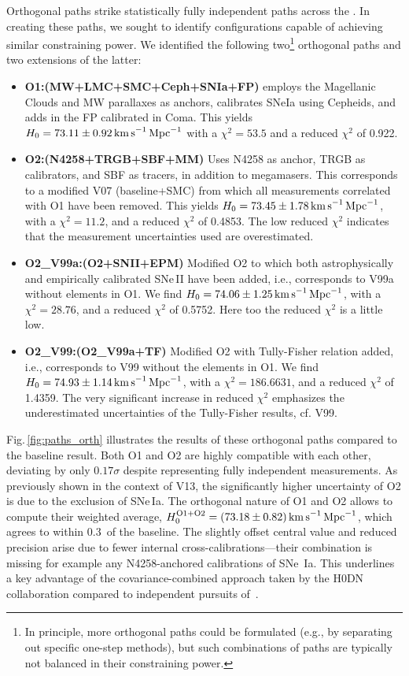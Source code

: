 Orthogonal paths strike statistically fully independent paths across the \DN{}. In creating these paths, we sought to identify configurations capable of achieving similar constraining power.
We identified the following two\footnote{In principle, more orthogonal paths could be formulated (e.g., by separating out specific one-step methods), but such combinations of paths are typically not balanced in their constraining power.} orthogonal paths and two extensions of the latter:
\begin{itemize}
    \item \textbf{O1:(MW+LMC+SMC+Ceph+SNIa+FP)} employs the Magellanic Clouds and MW parallaxes as anchors, calibrates SNeIa using Cepheids, and adds in the FP calibrated in Coma. This yields $H_0 = 73.11 \pm 0.92 \,{\rm km\,s}^{-1}{\rm\,Mpc}^{-1}$ with a $\chi^2=53.5$ and a reduced $\chi^2$ of 0.922.
    \item \textbf{O2:(N4258+TRGB+SBF+MM)} Uses N4258 as anchor, TRGB as calibrators, and SBF as tracers, in addition to megamasers. This corresponds to a modified V07 (baseline+SMC) from which all measurements correlated with O1 have been removed. This yields $H_0 = 73.45 \pm 1.78 \,{\rm km\,s}^{-1}{\rm\,Mpc}^{-1}$, with a $\chi^2=11.2$, and a reduced  $\chi^2$ of 0.4853. The low reduced $\chi^2$ indicates that the measurement uncertainties used are overestimated.
    \item \textbf{O2\_V99a:(O2+SNII+EPM)} Modified O2 to which both astrophysically and empirically calibrated SNe\,II have been added, i.e., corresponds to V99a without elements in O1. We find $H_0 = 74.06 \pm 1.25 \,{\rm km\,s}^{-1}{\rm\,Mpc}^{-1}$, with a $\chi^2=28.76$, and a reduced  $\chi^2$ of 0.5752. Here too the reduced $\chi^2$ is a little low.
    \item \textbf{O2\_V99:(O2\_V99a+TF)} Modified O2 with Tully-Fisher relation added, i.e., corresponds to V99 without the elements in O1. We find $H_0 = 74.93 \pm 1.14 \,{\rm km\,s}^{-1}{\rm\,Mpc}^{-1}$, with a $\chi^2=186.6631$, and a reduced  $\chi^2$ of 1.4359. The very significant increase in reduced $\chi^2$ emphasizes the underestimated uncertainties of the Tully-Fisher results, cf. V99.
\end{itemize} 
Fig.\,\ref{fig:paths_orth} illustrates the results of these orthogonal paths compared to the baseline result. Both O1 and O2 are highly compatible with each other, deviating by only $0.17\sigma$ despite representing fully independent measurements. As previously shown in the context of V13, the significantly higher uncertainty of O2 is due to the exclusion of SNe\,Ia. 
The orthogonal nature of O1 and O2 allows to compute their weighted average, $H_0^\mathrm{O1+O2} = (73.18\pm 0.82)\,{\rm km\,s}^{-1}{\rm\,Mpc}^{-1}$, which agrees to within $0.3\,$\Hunit{} of the baseline. The slightly offset central value and reduced precision arise due to fewer internal cross-calibrations---their combination is missing for example any N4258-anchored calibrations of SNe~Ia. This underlines a key advantage of the covariance-combined approach taken by the H0DN collaboration compared to independent pursuits of \Hcst{}\,.


